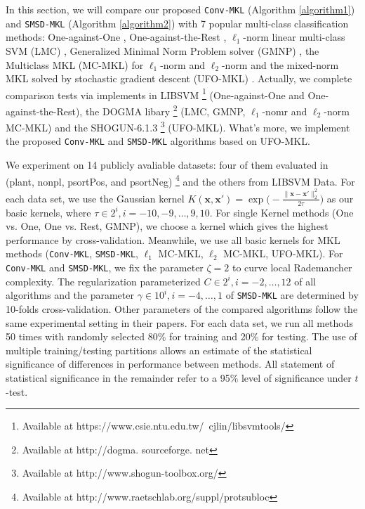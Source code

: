 \documentclass{article}
\begin{document}
In this section, we will  compare our proposed \texttt{Conv-MKL} (Algorithm \ref{algorithm1}) and \texttt{SMSD-MKL} (Algorithm \ref{algorithm2})
with 7 popular multi-class classification methods:
 One-against-One \cite{knerr1990single}, One-against-the-Rest \cite{bottou1994comparison},
$\ell_1$-norm linear multi-class SVM (LMC) \cite{CrammerS02},
Generalized Minimal Norm Problem solver (GMNP) \cite{franc2005optimization},
the Multiclass MKL (MC-MKL) for $\ell_1$-norm and $\ell_2$-norm \cite{ZienO2007} 
and the mixed-norm MKL solved by stochastic gradient descent (UFO-MKL) \cite{OrabonaL11}.
Actually, we complete comparison tests via implements in LIBSVM \footnote{Available at https://www.csie.ntu.edu.tw/~cjlin/libsvmtools/} 
(One-against-One and One-against-the-Rest), 
the DOGMA libary \footnote{Available at http://dogma. sourceforge. net} \cite{orabona2009dogma} (LMC, GMNP, 
$\ell_1$-nomr and $\ell_2$-norm MC-MKL) and the SHOGUN-6.1.3 \footnote{Available at http://www.shogun-toolbox.org/} (UFO-MKL). 
What's more, we implement the proposed \texttt{Conv-MKL} and \texttt{SMSD-MKL} algorithms based on UFO-MKL.

We experiment on 14 publicly avaliable datasets:
four of them evaluated in \cite{ZienO2007} (plant, nonpl, psortPos, and psortNeg)
\footnote{Available at http://www.raetschlab.org/suppl/protsubloc}
and the others from LIBSVM Data. %
For each data set, we use the Gaussian kernel
$K(\mathbf{x}, \mathbf{x}')=\exp\Big(-\frac{\|\mathbf{x}-\mathbf{x}'\|_2^2}{2\tau}\Big)$ as our basic kernels, 
where $\tau \in {2^i, i=-10,-9,\ldots,9,10}$. For single Kernel methods (One vs. One, One vs. Rest, GMNP), 
we choose a kernel which gives the highest performance by cross-validation. 
Meanwhile, we use all basic kernels for MKL methods (\texttt{Conv-MKL}, \texttt{SMSD-MKL}, $\ell_1$ MC-MKL, $\ell_2$ MC-MKL, UFO-MKL). 
For \texttt{Conv-MKL} and \texttt{SMSD-MKL}, we fix the parameter $\zeta=2$ to curve local Rademancher complexity.
The regularization parameterized $C \in {2^i, i=-2, \ldots, 12}$ of all algorithms and
the parameter $\gamma \in {10^i, i=-4, \ldots, 1}$ of \texttt{SMSD-MKL} are determined by 10-folds cross-validation.
Other parameters of the compared algorithms follow the same experimental setting in their papers.
For each data set, we run all methods 50 times with randomly selected 80\% for training and 20\% for testing.
The use of multiple training/testing partitions allows an estimate of the statistical significance of differences
in performance between methods.
All statement of statistical significance in the remainder refer to a 95\% level of significance under $t$-test.
\end{document}
